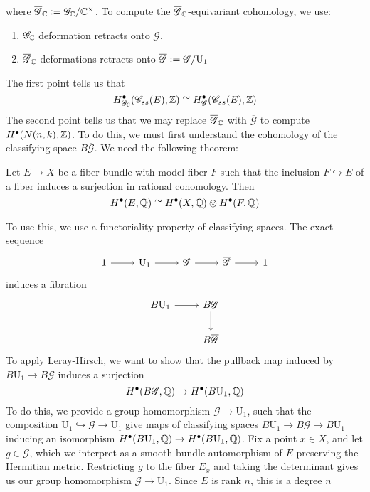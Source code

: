 where $\overline{\mathscr{G}}_{\mathbb{C}} \vcentcolon= \mathscr{G}_{\mathbb{C}}/\mathbb{C}^\times$. To
compute the $\overline{\mathscr{G}}_{\mathbb{C}}$-equivariant cohomology, we use:
\begin{enumerate}
  \item $\mathscr{G}_{\mathbb{C}}$ deformation retracts onto $\mathscr{G}$.
  \item $\overline{\mathscr{G}}_{\mathbb{C}}$ deformations retracts onto
  $\overline{\mathscr{G}} \vcentcolon= \mathscr{G}/\mathrm{U}_1$
\end{enumerate}
The first point tells us that
\[
H^\bullet_{\mathscr{G}_{\mathbb{C}}}(\mathscr{C}_{ss}(E),\mathbb{Z})
\cong H^\bullet_\mathscr{G}(\mathscr{C}_{ss}(E),\mathbb{Z})
\]
The second point tells us that we may replace $\overline{\mathscr{G}}_{\mathbb{C}}$ with
$\overline{\mathscr{G}}$ to compute $H^\bullet(N(n,k),\mathbb{Z})$. To do this, we
must first understand the cohomology of the classifying space
$B\overline{\mathscr{G}}$. We need the following theorem:
%
\begin{thm}
Let $E \to X$ be a fiber bundle with model fiber $F$ such that
the inclusion $F \hookrightarrow E$ of a fiber induces a surjection
in rational cohomology. Then
\[
H^\bullet(E,\mathbb{Q}) \cong H^\bullet(X,\mathbb{Q}) \otimes H^\bullet(F,\mathbb{Q})
\]
\end{thm}
%
To use this, we use a functoriality property of classifying spaces.
The exact sequence
\[\begin{tikzcd}
1 \ar[r] & \mathrm{U}_1 \ar[r] & \mathscr{G} \ar[r] & \overline{\mathscr{G}} \ar[r] & 1
\end{tikzcd}\]
induces a fibration
\[\begin{tikzcd}
B \mathrm{U}_1 \ar[r] & B\mathscr{G} \ar[d] \\
& B\overline{\mathscr{G}}
\end{tikzcd}\]
To apply Leray-Hirsch, we want to show that the pullback map induced
by $B \mathrm{U}_1 \to B\mathscr{G}$ induces a surjection
\[
H^\bullet(B\mathscr{G},\mathbb{Q}) \to H^\bullet(B \mathrm{U}_1, \mathbb{Q})
\]
To do this, we provide a group homomorphism $\mathscr{G} \to \mathrm{U}_1$,
such that the composition $\mathrm{U}_1 \hookrightarrow \mathscr{G} \to \mathrm{U}_1$
give maps of classifying spaces $B\mathrm{U}_1 \to B\mathscr{G} \to B\mathrm{U}_1$
inducing an isomorphism $H^\bullet(B \mathrm{U}_1,\mathbb{Q}) \to H^\bullet(B \mathrm{U}_1,\mathbb{Q})$.
Fix a point $x \in X$, and let $g \in \mathscr{G}$, which we interpret as a
smooth bundle automorphism of $E$ preserving the Hermitian metric. Restricting $g$
to the fiber $E_x$ and taking the determinant gives us our group homomorphism
$\mathscr{G} \to \mathrm{U}_1$. Since $E$ is rank $n$, this is a degree $n$
